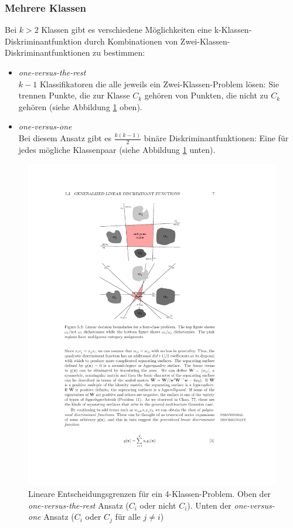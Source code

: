 \subsubsection*{Mehrere Klassen}
Bei $k > 2$ Klassen gibt es verschiedene Möglichkeiten eine k-Klassen-Diskriminantfunktion durch Kombinationen von Zwei-Klassen-Diskriminantfunktionen zu bestimmen:
\begin{itemize}
 	\item \emph{one-versus-the-rest} \\
 	$k-1$ Klassifikatoren die alle jeweils ein Zwei-Klassen-Problem lösen: Sie trennen Punkte, die zur Klasse $C_k$ gehören von Punkten, die nicht zu $C_k$ gehören (siehe Abbildung \ref{fig:lineare-entscheidungsfunktion-mehrere-klassen} oben).

 	\item \emph{one-versus-one} \\
 	Bei diesem Ansatz gibt es $\frac{k(k-1)}{2}$ binäre Diskriminantfunktionen: Eine für jedes mögliche Klassenpaar (siehe Abbildung \ref{fig:lineare-entscheidungsfunktion-mehrere-klassen} unten). 
 \end{itemize} 

\begin{figure}[ht!] \centering 
	\includegraphics[width=\linewidth]{figures/ch02_lineare-entscheidungsfunktion-mehrere-klassen.pdf}
	\caption{Lineare Entscheidungsgrenzen für ein 4-Klassen-Problem. Oben der \emph{one-versus-the-rest} Ansatz ($C_i$ oder nicht $C_i$). Unten der \emph{one-versus-one} Ansatz ($C_i$ oder $C_j$ für alle $j \ne i$)}
	\label{fig:lineare-entscheidungsfunktion-mehrere-klassen}
\end{figure}

